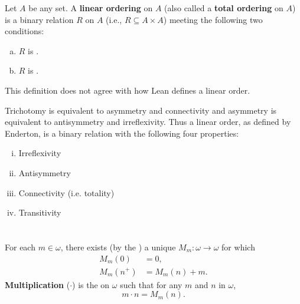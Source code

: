 \documentclass{report}
\begin{document}
  Let $A$ be any set.
  A \textbf{linear ordering} on $A$ (also called a \textbf{total ordering} on
    $A$) is a binary relation $R$ on $A$ (i.e., $R \subseteq A \times A$)
    meeting the following two conditions:

  \begin{enumerate}[(a)]
    \item $R$ is .
    \item $R$ is .
  \end{enumerate}


  \begin{note}
    This definition does not agree with how Lean defines a linear order.

    \vspace{6pt}
    Trichotomy is equivalent to asymmetry and connectivity and asymmetry is
      equivalent to antisymmetry and irreflexivity.
    Thus a linear order, as defined by Enderton, is a binary relation with the
      following four properties:

    \vspace{6pt}
    \begin{enumerate}[(i)]
      \item Irreflexivity
      \item Antisymmetry
      \item Connectivity (i.e. totality)
      \item Transitivity
    \end{enumerate}
  \end{note}

\section{}%

  For each $m \in \omega$, there exists (by the
    ) a unique
     $M_m \colon \omega \rightarrow \omega$ for which
    \begin{align*}
      M_m(0) & = 0, \\
      M_m(n^+) & = M_m(n) + m.
    \end{align*}
  \textbf{Multiplication} ($\cdot$) is the  on
    $\omega$ such that for any $m$ and $n$ in $\omega$, $$m \cdot n = M_m(n).$$
\end{document}
